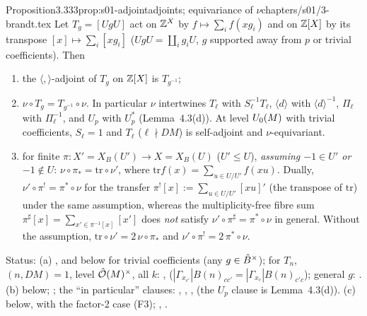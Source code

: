 \begin{quoted}{Proposition}{3.3}{33}{prop:s01-adjoint}{adjoints; equivariance of $\nu$}{chapters/s01/3-brandt.tex}\label{rpt:prop:s01-adjoint}
Let $T_g=[UgU]$ act on $\mathbb{Z}^X$ by $f\mapsto\sum_if(xg_i)$ and on $\mathbb{Z}[X]$ by its transpose $[x]\mapsto\sum_i[xg_i]$
($UgU=\coprod_ig_iU$, $g$ supported away from $p$ or trivial coefficients). Then
\begin{enumerate}[label=(\alph*)]
\item the $\langle,\rangle$-adjoint of $T_g$ on $\mathbb{Z}[X]$ is $T_{g^{-1}}$;
\item $\nu\circ T_g=T_{g^{-1}}\circ\nu$. In particular $\nu$ intertwines $T_\ell$ with $S_\ell^{-1}T_\ell$, $\langle d\rangle$ with
  $\langle d\rangle^{-1}$, $\Pi_\ell$ with $\Pi_\ell^{-1}$, and $U_p$ with $U_p^{*}$ (Lemma~4.3(d)). At level
  $U_0(M)$ with trivial coefficients, $S_\ell=1$ and $T_\ell$ ($\ell\nmid DM$) is self-adjoint and $\nu$-equivariant.
\item for finite $\pi:X'=X_B(U')\to X=X_B(U)$ ($U'\le U$), \emph{assuming $-1\in U'$ or $-1\notin U$}: $\nu\circ\pi_*=\mathrm{tr}\circ\nu'$, where
  $\mathrm{tr}f(x)=\sum_{u\in U/U'}f(xu)$. Dually, $\nu'\circ\pi^!=\pi^*\circ\nu$ for the transfer
  $\pi^![x]:=\sum_{u\in U/U'}[xu]'$ (the transpose of $\mathrm{tr}$) under the same assumption, whereas the multiplicity-free fibre sum
  $\pi^\sharp[x]=\sum_{x'\in\pi^{-1}[x]}[x']$ does \emph{not} satisfy $\nu'\circ\pi^\sharp=\pi^*\circ\nu$ in general.
  Without the assumption, $\mathrm{tr}\circ\nu'=2\,\nu\circ\pi_*$ and $\nu'\circ\pi^!=2\,\pi^*\circ\nu$.
\end{enumerate}
Status: (a) \stcited{} \cite[Prop.~6.9, p.~73 (adjoint of $T(g)$ is $\mu_A(g)T(g^{-1})$;
$\mu=1$ for trivial $V$)]{Gr99}, and \stproved{} below for trivial coefficients (any $g\in\hat{B}^\times$); \stformal{} for $T_n$, $(n,DM)=1$, level $\hat{\mathcal{O}}(M)^\times$, all $k$:
 ,  
($|\Gamma_{x_{c'}}|B(n)_{cc'}=|\Gamma_{x_c}|B(n)_{c'c}$); general $g$:  \stformal{}.
(b) \stproved{} below;  \stformal{}; the ``in particular'' clauses:
, , ,
 \stformal{} (the $U_p$ clause is Lemma~4.3(d)).
(c) \stproved{} below, with the factor-2 case (F3); ,
 \stformal{}.
\end{quoted}
